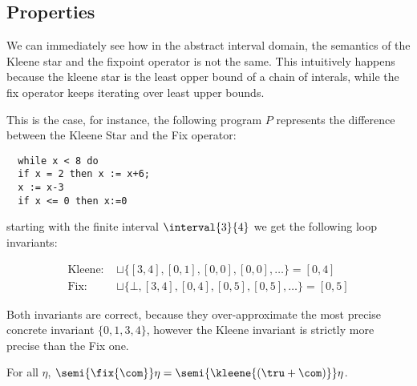 \subsection{Properties}
\label{sub:intervalsprop}

We can immediately see how in the abstract interval domain, the
semantics of the Kleene star and the fixpoint operator is not the
same. This intuitively happens because the kleene star is the least
opper bound of a chain of interals, while the fix operator keeps
iterating over least upper bounds.

\begin{example} \label{ex:fix}
  This is the case, for instance, the following program \(P\)
  represents the difference between the Kleene Star and the Fix
  operator:
\begin{verbatim}
  while x < 8 do
  if x = 2 then x := x+6;
  x := x-3
  if x <= 0 then x:=0
\end{verbatim}
starting with the finite interval \(\interval{3}{4}\) we get the
following loop invariants:

\begin{align*}
  \text{Kleene: } &\sqcup\{[3,4], [0,1], [0,0], [0,0], \ldots\} = [0,4]\\[5pt]
  \text{Fix: } & \sqcup\{\bot, [3,4], [0,4], [0,5], [0,5],\ldots\} = [0,5]
\end{align*}

\noindent
Both invariants are correct, because they over-approximate the most
precise concrete invariant \(\{0,1,3,4\}\), however the Kleene
invariant is strictly more precise than the Fix one.
\end{example}

\begin{lemma}\label{le:sugar}
  For all \(\eta\),
  \(\semi{\fix{\com}} \eta = \semi{\kleene{(\tru + \com)}} \eta\).
\end{lemma}

